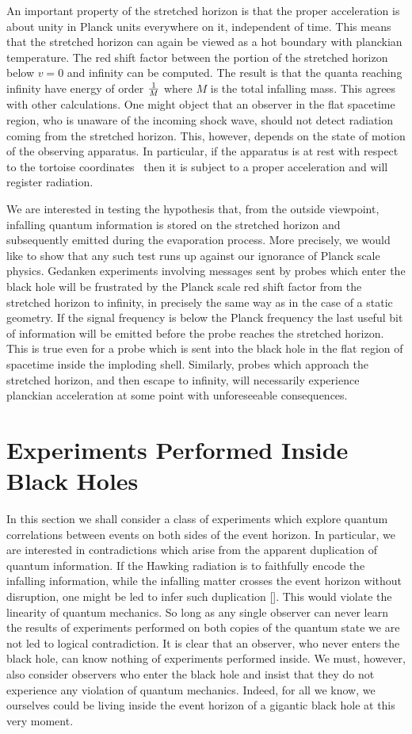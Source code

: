 An important property of the stretched horizon is that the proper
acceleration is about unity in Planck units everywhere on it,
independent of time.  This means that the stretched horizon can again
be viewed as a hot boundary with planckian temperature.  The red
shift factor between the portion of the stretched horizon below $v=0$
and infinity can be computed.  The result is that the quanta reaching
infinity have energy of order ${1 \over M}$ where $M$ is the total
infalling mass.  This agrees with other calculations.  One might
object that an observer in the flat spacetime region, who is unaware
of the incoming shock wave, should not detect radiation coming from
the stretched horizon.  This, however, depends on the state of motion
of the observing apparatus.  In particular, if the apparatus is at
rest with respect to the tortoise coordinates \tort\ then it is
subject to a proper acceleration and will register radiation.

We are interested in testing the hypothesis that, from the outside
viewpoint, infalling quantum information is stored on the stretched
horizon and subsequently emitted during the evaporation process.
More precisely, we would like to show that any such test runs up
against our ignorance of Planck scale physics.  Gedanken experiments
involving messages sent by probes which enter the black hole will be
frustrated by the Planck scale red shift factor from the stretched
horizon to infinity, in precisely the same way as in the case of a
static geometry.  If the signal frequency is below the Planck
frequency the last useful bit of information will be emitted before
the probe reaches the stretched horizon.  This is true even for a
probe which is sent into the black hole in the flat region of
spacetime inside the imploding shell.  Similarly, probes which
approach the stretched horizon, and then escape to infinity, will
necessarily experience planckian acceleration at some point with
unforeseeable consequences.

\chapter{Experiments Performed Inside Black Holes}

In this section we shall consider a class of experiments which
explore quantum correlations between events on both sides of the
event horizon.  In particular, we are interested in contradictions
which arise from the apparent duplication of quantum information.  If
the Hawking radiation is to faithfully encode the infalling
information, while the infalling matter crosses the event horizon
without disruption, one might be led to infer such duplication
[\stu].  This would violate the linearity of quantum mechanics.  So
long as any single observer can never learn the results of
experiments performed on both copies of the quantum state we are not
led to logical contradiction.  It is clear that an observer, who
never enters the black hole, can know nothing of experiments
performed inside.  We must, however, also consider observers who
enter the black hole and insist that they do not experience any
violation of quantum mechanics.  Indeed, for all we know, we
ourselves could be living inside the event horizon of a gigantic
black hole at this very moment.

